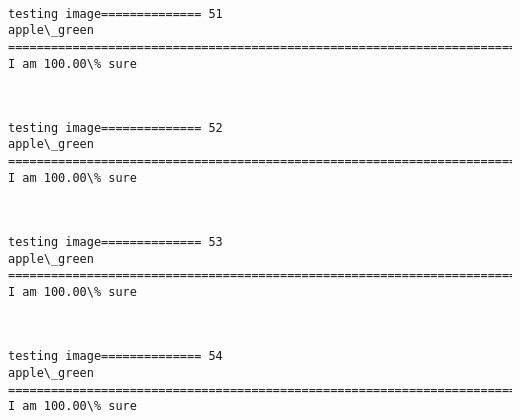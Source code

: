 \documentclass[11pt]{article}
\begin{document}
    \begin{center}
    \end{center}
    { \hspace*{\fill} \\}
    
    \begin{Verbatim}[commandchars=\\\{\}]
testing image============== 51
apple\_green
============================================================================
I am 100.00\% sure

    \end{Verbatim}

    \begin{center}
    \end{center}
    { \hspace*{\fill} \\}
    
    \begin{Verbatim}[commandchars=\\\{\}]
testing image============== 52
apple\_green
============================================================================
I am 100.00\% sure

    \end{Verbatim}

    \begin{center}
    \end{center}
    { \hspace*{\fill} \\}
    
    \begin{Verbatim}[commandchars=\\\{\}]
testing image============== 53
apple\_green
============================================================================
I am 100.00\% sure

    \end{Verbatim}

    \begin{center}
    \end{center}
    { \hspace*{\fill} \\}
    
    \begin{Verbatim}[commandchars=\\\{\}]
testing image============== 54
apple\_green
============================================================================
I am 100.00\% sure

    \end{Verbatim}
\end{document}
